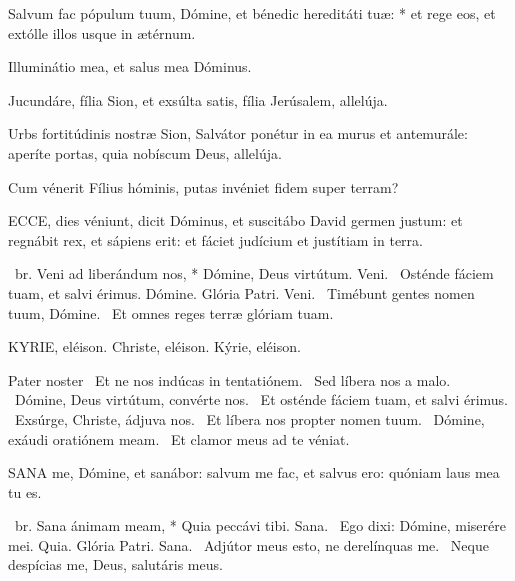 Salvum fac pópulum tuum, Dómine, et bénedic hereditáti tuæ: * et rege eos, et extólle illos usque in ætérnum.

  Illuminátio mea, et salus mea Dóminus.


  Jucundáre, fília Sion, et exsúlta satis, fília Jerúsalem, allelúja.

  Urbs fortitúdinis nostræ Sion, Salvátor ponétur in ea murus et antemurále: aperíte portas, quia nobíscum Deus, allelúja.

  Cum vénerit Fílius hóminis, putas invéniet fidem super terram?


\lettrine[lines=2]{E}{CCE}, dies véniunt, dicit Dóminus, et suscitábo David germen justum: et regnábit rex, et sápiens erit: et fáciet judícium et justítiam in terra.

\R\ br. Veni ad liberándum nos, * Dómine, Deus virtútum. Veni. \V\ Osténde fáciem tuam, et salvi érimus. Dómine. Glória Patri. Veni. \V\ Timébunt gentes nomen tuum, Dómine. \R\ Et omnes reges terræ glóriam tuam.


KYRIE, eléison. Christe, eléison. Kýrie, eléison.

Pater noster  \V\ Et ne nos indúcas in tentatiónem. \R\ Sed líbera nos a malo. \V\ Dómine, Deus virtútum, convérte nos. \R\ Et osténde fáciem tuam, et salvi érimus. \V\ Exsúrge, Christe, ádjuva nos. \R\ Et líbera nos propter nomen tuum. \V\ Dómine, exáudi oratiónem meam. \R\ Et clamor meus ad te véniat.



\lettrine[lines=2]{S}{ANA} me, Dómine, et sanábor: salvum me fac, et salvus ero: quóniam laus mea tu es.

\R\ br. Sana ánimam meam, * Quia peccávi tibi. Sana. \V\ Ego dixi: Dómine, miserére mei. Quia. Glória Patri. Sana. \V\ Adjútor meus esto, ne derelínquas me. \R\ Neque despícias me, Deus, salutáris meus.


